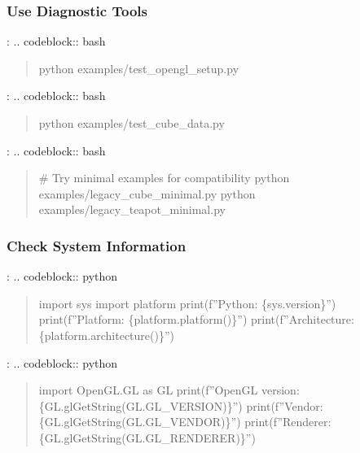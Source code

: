 \documentclass[a4paper,10pt,english,openany,oneside]{sphinxmanual}
\begin{document}
\subsubsection{Use Diagnostic Tools}
\label{\detokenize{troubleshooting:use-diagnostic-tools}}
\sphinxAtStartPar
{}:
.. code\sphinxhyphen{}block:: bash
\begin{quote}

\sphinxAtStartPar
python examples/test\_opengl\_setup.py
\end{quote}

\sphinxAtStartPar
{}:
.. code\sphinxhyphen{}block:: bash
\begin{quote}

\sphinxAtStartPar
python examples/test\_cube\_data.py
\end{quote}

\sphinxAtStartPar
{}:
.. code\sphinxhyphen{}block:: bash
\begin{quote}

\sphinxAtStartPar
\# Try minimal examples for compatibility
python examples/legacy\_cube\_minimal.py
python examples/legacy\_teapot\_minimal.py
\end{quote}


\subsubsection{Check System Information}
\label{\detokenize{troubleshooting:check-system-information}}
\sphinxAtStartPar
{}:
.. code\sphinxhyphen{}block:: python
\begin{quote}

\sphinxAtStartPar
import sys
import platform
print(f”Python: \{sys.version\}”)
print(f”Platform: \{platform.platform()\}”)
print(f”Architecture: \{platform.architecture()\}”)
\end{quote}

\sphinxAtStartPar
{}:
.. code\sphinxhyphen{}block:: python
\begin{quote}

\sphinxAtStartPar
import OpenGL.GL as GL
print(f”OpenGL version: \{GL.glGetString(GL.GL\_VERSION)\}”)
print(f”Vendor: \{GL.glGetString(GL.GL\_VENDOR)\}”)
print(f”Renderer: \{GL.glGetString(GL.GL\_RENDERER)\}”)
\end{quote}
\end{document}
